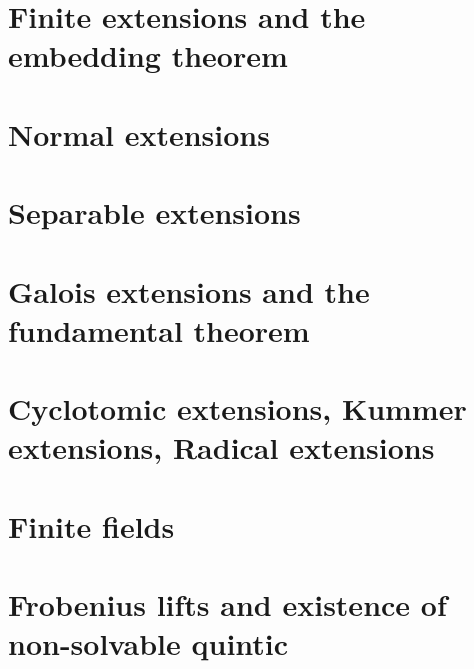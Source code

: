 \documentclass{article}
\begin{document}

\section{Finite extensions and the embedding theorem}

\section{Normal extensions}

\section{Separable extensions}

\section{Galois extensions and the fundamental theorem}

\section{Cyclotomic extensions, Kummer extensions, Radical extensions}

\section{Finite fields}

\section{Frobenius lifts and existence of non-solvable quintic}

\printbibliography
\end{document}
